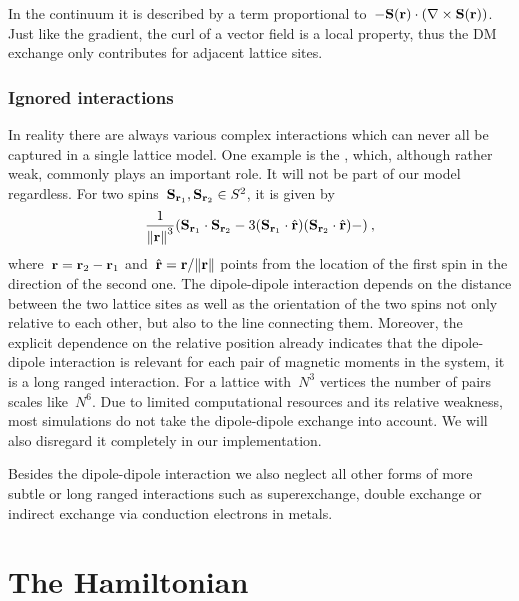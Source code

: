 In the continuum it is described by a term proportional to~$-\mathbf{S}(\mathbf{r}) \cdot
(\nabla \times \mathbf{S}(\mathbf{r}))$. Just like the gradient, the curl of a vector field is a
local property, thus the DM exchange only contributes for adjacent lattice
sites.

\subsubsection{Ignored interactions}

In reality there are always various complex interactions which can never all be
captured in a single lattice model. One example is the , which, although rather weak, commonly plays an important role. It
will not be part of our model regardless. For two spins~$\mathbf{S}_{\mathbf{r}_1}, \mathbf{S}_{\mathbf{r}_2}
\in S^2$, it is given by
%
\begin{equation}
  \frac{1}{\norm{\r}^{3}} (\S_{\r_1} \cdot \S_{\r_2} -
  3 (\S_{\r_1} \cdot \hat{\r}) (\S_{\r_2} \cdot \hat{\r}) - )\:,
\end{equation}
%
where~$\mathbf{r} = \mathbf{r}_2 - \mathbf{r}_1$ and~$\hat{\r} = \r / \norm{\r}$ points from the
location of the first spin in the direction of the second one. The dipole-dipole
interaction depends on the distance between the two lattice sites as well as the
orientation of the two spins not only relative to each other, but also to the
line connecting them. Moreover, the explicit dependence on the relative position
already indicates that the dipole-dipole interaction is relevant for each pair
of magnetic moments in the system, it is a long ranged interaction. For a
lattice with~$N^3$ vertices the number of pairs scales like~$N^6$. Due to
limited computational resources and its relative weakness, most simulations do
not take the dipole-dipole exchange into account. We will also disregard it
completely in our implementation.

Besides the dipole-dipole interaction we also neglect all other forms of more
subtle or long ranged interactions such as superexchange, double exchange or
indirect exchange via conduction electrons in metals.
%
\section{The Hamiltonian}\label{sec:hamiltonian}
%


